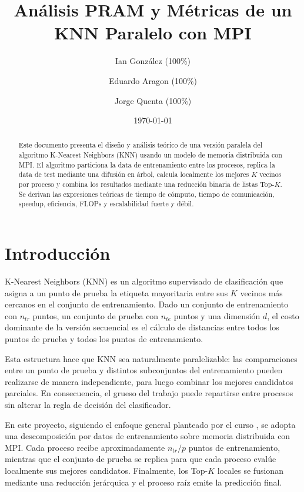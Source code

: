 \documentclass[11pt,a4paper]{article}
\title{Análisis PRAM y Métricas de un KNN Paralelo con MPI}
\author{
    Ian González (100\%) \and Eduardo Aragon (100\%) \and Jorge Quenta (100\%)
}
\date{\today}
\begin{document}

\maketitle

\begin{abstract}
Este documento presenta el diseño y análisis teórico de una versión paralela del algoritmo
K-Nearest Neighbors (KNN) usando un modelo de memoria distribuida con MPI. El algoritmo
particiona la data de entrenamiento entre los procesos, replica la data de test mediante una
difusión en árbol, calcula localmente los mejores $K$ vecinos por proceso y combina los resultados
mediante una reducción binaria de listas Top-$K$. Se derivan las expresiones teóricas de tiempo
de cómputo, tiempo de comunicación, speedup, eficiencia, FLOPs y escalabilidad fuerte y débil.
\end{abstract}

\section{Introducción}

K-Nearest Neighbors (KNN) es un algoritmo supervisado de clasificación que asigna a un punto
de prueba la etiqueta mayoritaria entre sus $K$ vecinos más cercanos en el conjunto de
entrenamiento. Dado un conjunto de entrenamiento con $n_{tr}$ puntos, un conjunto de prueba
con $n_{te}$ puntos y una dimensión $d$, el costo dominante de la versión secuencial es el
cálculo de distancias entre todos los puntos de prueba y todos los puntos de entrenamiento.

Esta estructura hace que KNN sea naturalmente paralelizable: las comparaciones entre un punto
de prueba y distintos subconjuntos del entrenamiento pueden realizarse de manera independiente,
para luego combinar los mejores candidatos parciales. En consecuencia, el grueso del trabajo
puede repartirse entre procesos sin alterar la regla de decisión del clasificador.

En este proyecto, siguiendo el enfoque general planteado por el curso \cite{course}, se adopta una
descomposición por datos de entrenamiento sobre memoria distribuida con MPI. Cada proceso recibe
aproximadamente $n_{tr}/p$ puntos de entrenamiento, mientras que el conjunto de prueba se replica
para que cada proceso evalúe localmente sus mejores candidatos. Finalmente, los Top-$K$ locales se
fusionan mediante una reducción jerárquica y el proceso raíz emite la predicción final.
\end{document}
